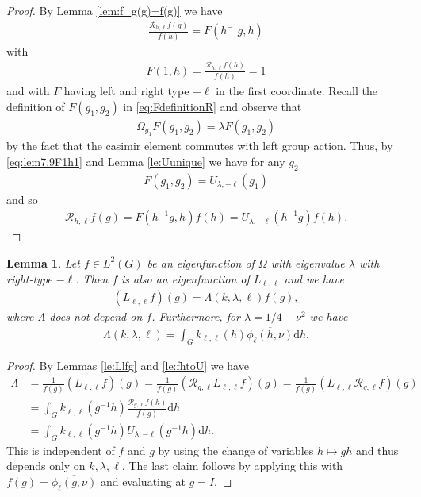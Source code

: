 \documentclass[12pt]{amsart}
\newtheorem{lemma}[theorem]{Lemma}
\theoremstyle{definition}
\theoremstyle{remark}
\numberwithin{equation}{section}
\newcommand{\1}{{\mathbf 1}}
\renewcommand{\d}{\mathrm d}
\begin{document}
\begin{proof}
By Lemma \ref{lem:f_g(g)=f(g)} we have
\begin{align*}
    \frac{\mathcal{R}_{h,\ell}f(g)}{f(h)} = F(h^{-1}g,h)
\end{align*}
with 
\begin{align}\label{eq:lem7.9F1h1}
    F(1,h)=\frac{\mathcal{R}_{h,\ell}f(h)}{f(h)}=1
\end{align}
and with $F$ having left and right type $-\ell$ in the first coordinate. Recall the definition of $F(g_1,g_2)$ in \eqref{eq:FdefinitionR} and observe that 
\begin{align*}
    \Omega_{g_1} F(g_1,g_2)=\lambda F(g_1,g_2)
\end{align*}
by the fact that the casimir element commutes with left group action. Thus, by \eqref{eq:lem7.9F1h1} and Lemma \ref{le:Uunique} we have for any $g_2$
\begin{align*}
  F(g_1,g_2)=U_{\lambda,-\ell}(g_1)
\end{align*}
and so
\begin{align*}
  \mathcal{R}_{h,\ell}f(g)=F(h^{-1}g,h) f(h) = U_{\lambda,-\ell}(h^{-1} g ) f(h).
\end{align*}
\end{proof}


\begin{lemma}\label{le:Llf=Lambdaf}
    Let $f \in L^2(G)$ be an eigenfunction of $\Omega$ with eigenvalue $\lambda$ with right-type $-\ell$. Then $f$ is also an eigenfunction of $L_{\ell,\ell}$ and we have
    \begin{align*}
        (L_{\ell,\ell} f)(g)= \Lambda(k,\lambda,\ell)f(g),
    \end{align*}
    where $\Lambda$ does not depend on $f$. Furthermore, for $\lambda=1/4-\nu^2$ we have
    \begin{align} \label{eq:Lambdaformula}
\Lambda(k,\lambda,\ell) = \int_G k_{\ell,\ell}(h) \overline{\phi_\ell(h,\nu)} \d h.
    \end{align}
\end{lemma}
\begin{proof}
    By Lemmas \ref{le:Llfg} and \ref{le:fhtoU}  we have
    \begin{align*}
        \Lambda  &= \frac{1}{f(g)} (L_{\ell,\ell}f)(g) = \frac{1}{f(g)}(\mathcal{R}_{g,\ell} L_{\ell,\ell} f)(g) = \frac{1}{f(g)}(L_{\ell,\ell}\mathcal{R}_{g,\ell}f)(g)   \\
       & =  \int_{G} k_{\ell,\ell} (g^{-1}h)  \frac{\mathcal{R}_{g,\ell}f(h)}{f(g)} \d h  \\
       & = \int_{G} k_{\ell,\ell} (g^{-1}h) U_{\lambda,-\ell}(g^{-1}h) \d h.
    \end{align*}
    This is independent of $f$ and $g$ by using the change of variables $h \mapsto gh$ and thus depends only on $k,\lambda,\ell$. The last claim follows by applying this with $f(g)= \overline{\phi_\ell(g,\nu)}$ and evaluating at $g=I$.
\end{proof}
\end{document}
